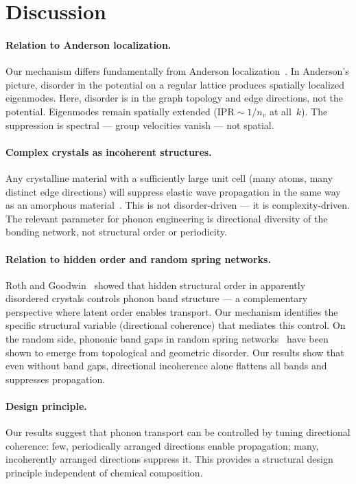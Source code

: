 \documentclass[12pt]{article}
\begin{document}
\section{Discussion}

\paragraph{Relation to Anderson localization.}
Our mechanism differs fundamentally from Anderson
localization~\cite{anderson58}.  In Anderson's picture, disorder in the
potential on a regular lattice produces spatially localized eigenmodes.  Here,
disorder is in the graph topology and edge directions, not the potential.
Eigenmodes remain spatially extended ($\mathrm{IPR} \sim 1/n_v$ at all~$k$).
The suppression is spectral --- group velocities vanish --- not spatial.

\paragraph{Complex crystals as incoherent structures.}
Any crystalline material with a sufficiently large unit cell (many atoms, many
distinct edge directions) will suppress elastic wave propagation in the same
way as an amorphous material~\cite{gelin16,baggioli19}.  This is not
disorder-driven --- it is complexity-driven.  The relevant parameter for phonon engineering is
directional diversity of the bonding network, not structural order or
periodicity.

\paragraph{Relation to hidden order and random spring networks.}
Roth and Goodwin~\cite{roth23} showed that hidden structural order in
apparently disordered crystals controls phonon band structure --- a
complementary perspective where latent order enables transport.  Our mechanism
identifies the specific structural variable (directional coherence) that
mediates this control.  On the random side, phononic band gaps in random spring
networks~\cite{spring23} have been shown to emerge from topological and
geometric disorder.  Our results show that even without band gaps, directional
incoherence alone flattens all bands and suppresses propagation.

\paragraph{Design principle.}
Our results suggest that phonon transport can be controlled by tuning
directional coherence: few, periodically arranged directions enable
propagation; many, incoherently arranged directions suppress it.  This
provides a structural design principle independent of chemical composition.
\end{document}
